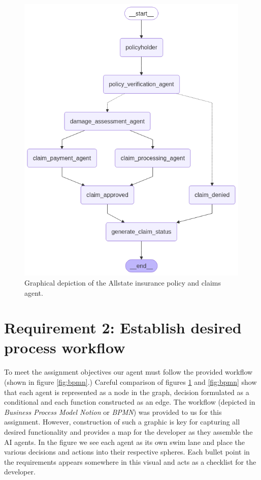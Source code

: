 \documentclass[11pt,letterpaper]{article}
\begin{document}
\begin{figure}[h!]
    \centering
    \includegraphics[height=400pt]{Assignment_03_NOTEBOOK_Geidel_9_0.png}
    \caption{Graphical depiction of the Allstate insurance policy and claims agent.}
    \label{fig:graph}
\end{figure}

\clearpage

\section*{Requirement 2: Establish desired process workflow}
\tab To meet the assignment objectives our agent must follow the provided workflow (shown in figure \ref{fig:bpmn}.)
Careful comparison of figures \ref{fig:graph} and \ref{fig:bpmn} show that each agent is represented as a node in the graph, 
decision formulated as a conditional and each function constructed as an edge. The workflow (depicted in \textit{Business Process Model Notion} or \textit{BPMN}) was provided to us for this assignment. However, construction of such a graphic is key for capturing all desired functionality and provides a map for the developer as they assemble the AI agents. In the figure we see each agent as its own swim lane and place the various decisions and actions into their respective spheres. Each bullet point in the requirements appears somewhere in this visual and acts as a checklist for the developer.
\end{document}
